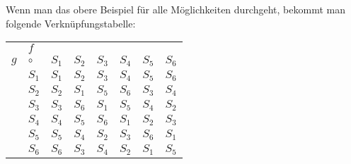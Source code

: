 \documentclass[12pt,a4paper,headsepline]{scrreprt}
\begin{document}
Wenn man das obere Beispiel für alle Möglichkeiten durchgeht, bekommt man folgende Verknüpfungstabelle:
\begin{center}
\begin{tabular}{cg|cccccc}
 &$f$ & & & & & & \\
$g$ & $\circ$ & $S_1$ & $S_2$ & $S_3$ & $S_4$ & $S_5$ & $S_6$\\ \hline
&$S_1$ & $S_1$ & $S_2$ & $S_3$ & $S_4$ & $S_5$ & $S_6$ \\
&$S_2$ & $S_2$ & $S_1$ & $S_5$ & $S_6$ & $S_3$ & $S_4$ \\
&$S_3$ & $S_3$ & $S_6$ & $S_1$ & $S_5$ & $S_4$ & $S_2$ \\
&$S_4$ & $S_4$ & $S_5$ & $S_6$ & $S_1$ & $S_2$ & $S_3$ \\
&$S_5$ & $S_5$ & $S_4$ & $S_2$ & $S_3$ & $S_6$ & $S_1$ \\
&$S_6$ & $S_6$ & $S_3$ & $S_4$ & $S_2$ & $S_1$ & $S_5$
\end{tabular}
\end{center}
\end{document}
